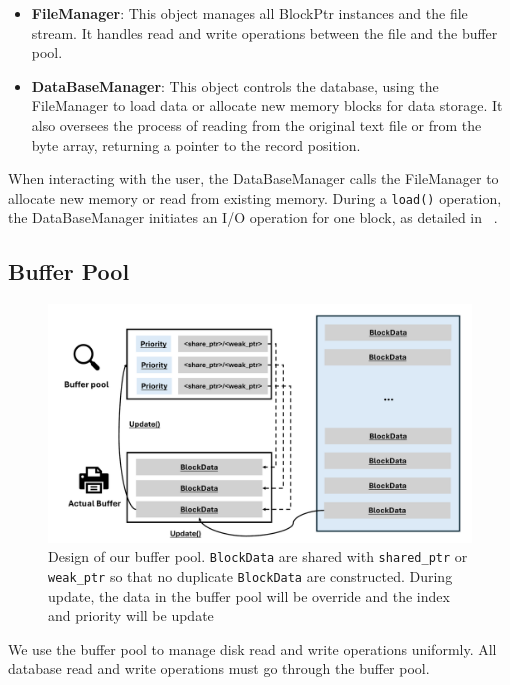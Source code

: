 \begin{itemize}
    \item \textbf{FileManager}: This object manages all BlockPtr instances and the file stream. It handles read and write operations between the file and the buffer pool.
    \item \textbf{DataBaseManager}: This object controls the database, using the FileManager to load data or allocate new memory blocks for data storage. It also oversees the process of reading from the original text file or from the byte array, returning a pointer to the record position.
\end{itemize}

When interacting with the user, the DataBaseManager calls the FileManager to allocate new memory or read from existing memory. During a \texttt{load()} operation, the DataBaseManager initiates an I/O operation for one block, as detailed in ~.

\subsection{Buffer Pool}
\label{subsec:io-control}

\begin{figure}[ht]
    \centering
    \includegraphics[width=1\linewidth]{figures/Buffer_pool.pdf}
    \caption{Design of our buffer pool. \texttt{BlockData} are shared with \texttt{shared\_ptr} or \texttt{weak\_ptr} so that no duplicate \texttt{BlockData} are constructed. During update, the data in the buffer pool will be override and the index and priority will be update}
    \label{fig:buffer-pool}
\end{figure}

We use the buffer pool to manage disk read and write operations uniformly. All database read and write operations must go through the buffer pool.

